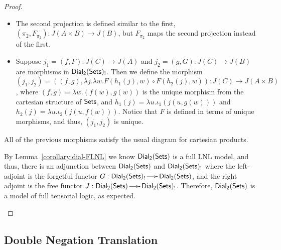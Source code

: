 \begin{proof}
\begin{report}
\begin{itemize}
\begin{itemize}
    \item The second projection is defined similar to the first,
      $(\pi_2, F_{\pi_2}) : J(A \times B) \to J(B)$, but $F_{\pi_2}$ maps
      the second projection instead of the first.

    \item Suppose $j_1 = (f , F) : J(C) \to J(A)$ and $j_2 = (g , G) : J(C) \to
      J(B)$ are morphisms in $\mathsf{Dial_2}(\mathsf{Sets})_!$.  Then we define the morphism
      $(j_1, j_2) = ((f,g),\lambda j.\lambda w.F(h_1(j),w) \circ F(h_2(j),w))
      : J(C) \to J(A \times B)$, where $(f,g) = \lambda w.(f(w),g(w))$ is the unique morphism
      from the cartesian structure of $\mathsf{Sets}$, and
      $h_1(j) = \lambda u.\iota_1(j(u,g(w)))$ and
      $h_2(j) = \lambda u.\iota_2(j(u,f(w)))$.
      Notice that $F$ is defined in terms of unique morphisms, and thus,
      $(j_1,j_2)$ is unique.
    \end{itemize}
    All of the previous morphisms satisfy the usual diagram for
    cartesian products.    
  \end{itemize}

  By Lemma~\ref{corollary:dial-FLNL} we know $\mathsf{Dial_2}(\mathsf{Sets})$ is a full LNL
  model, and thus, there is an adjunction between $\mathsf{Dial_2}(\mathsf{Sets})$ and
  $\mathsf{Dial_2}(\mathsf{Sets})_!$ where the left-adjoint is the forgetful functor $G :
  \mathsf{Dial_2}(\mathsf{Sets})_! \to \mathsf{Dial_2}(\mathsf{Sets})$, and the right adjoint is the free functor $J :
  \mathsf{Dial_2}(\mathsf{Sets}) \to \mathsf{Dial_2}(\mathsf{Sets})_!$.  Therefore, $\mathsf{Dial_2}(\mathsf{Sets})$ is a model of full tensorial
  logic, as expected.
  \end{report}
\end{proof}

\subsection{Double Negation Translation}
\label{subsec:a_negative_translation_of_linear_logic_into_fill_using_tensorial_negation}

